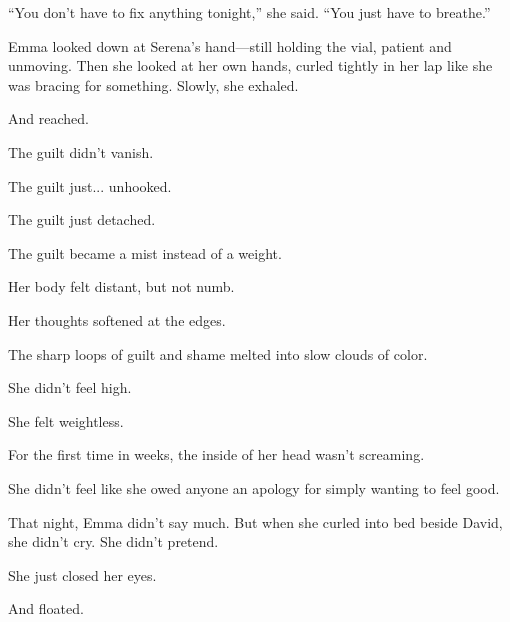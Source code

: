 ``You don’t have to fix anything tonight,'' she said. ``You just have to breathe.''

Emma looked down at Serena’s hand—still holding the vial, patient and unmoving. Then she looked at 
her own hands, curled tightly in her lap like she was bracing for something. Slowly, she exhaled.

And reached.

The guilt didn’t vanish. 

The guilt just... unhooked. 

The guilt just detached. 

The guilt became a mist instead of a weight. 

Her body felt distant, but not numb. 

Her thoughts softened at the edges. 

The sharp loops of guilt and shame melted into slow clouds of color.

She didn’t feel high.

She felt weightless.

For the first time in weeks, the inside of her head wasn’t screaming.

She didn’t feel like she owed anyone an apology for simply wanting to feel good.

That night, Emma didn’t say much. But when she curled into bed beside David, she didn’t cry.
She didn’t pretend.

She just closed her eyes.

And floated.

